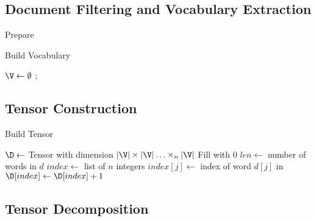 \documentclass[../ut-dissertation.tex]{subfiles}
\begin{document}
\subsection{Document Filtering and Vocabulary Extraction}
\begin{algorithm}
  \label{alg:Prepare}
  \caption{Prepare}
  \BlankLine
\end{algorithm}


\begin{algorithm}
  \label{alg:vocabulary}
  \caption{Build Vocabulary}
  \Output{\V}
  \BlankLine
  $\V\leftarrow\emptyset$\;
  \Return{\V};
\end{algorithm}

\subsection{Tensor Construction}
\begin{algorithm}
  \label{alg:BuildTensor}
  \caption{Build Tensor}
    
  
  \Output{\D}
  \BlankLine
  $\D \leftarrow $ Tensor with dimension $|\V| \times |\V| \ldots
  \times_n |\V|$\;
  Fill \D with 0\;
  $len \leftarrow$ number of words in $d$\;
   {
    $index \leftarrow$ list of $n$ integers\;
     {
      $index[j] \leftarrow$ index of word $d[j]$ in \V\;
    }
    \BlankLine
    $\D[index] \leftarrow \D[index] + 1$\;
  }
  \Return{\D}
\end{algorithm}

\subsection{Tensor Decomposition}
\end{document}
